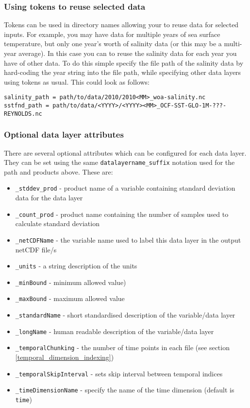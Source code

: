 \documentclass[]{scrartcl}
\begin{document}
{\subsubsection{Using tokens to reuse selected data}
Tokens can be used in directory names allowing your to reuse data for selected inputs. For example, you may have data for multiple years of sea surface temperature, but only one year's worth of salinity data (or this may be a multi-year average). In this case you can to reuse the salinity data for each year you have of other data. To do this simple specify the file path of the salinity data by hard-coding the year string into the file path, while specifying other data layers using tokens as usual. This could look as follows:
\begin{lstlisting}
salinity_path = path/to/data/2010/2010<MM>_woa-salinity.nc
sstfnd_path = path/to/data/<YYYY>/<YYYY><MM>_OCF-SST-GLO-1M-???-REYNOLDS.nc
\end{lstlisting}



\subsubsection{Optional data layer attributes}
There are several optional attributes which can be configured for each data layer. They can be set using the same \texttt{datalayername\_suffix} notation used for the path and products above. These are:
\begin{itemize}
	\item {\texttt{\_stddev\_prod} - product name of a variable containing standard deviation data for the data layer}
	\item {\texttt{\_count\_prod} - product name containing the number of samples used to calculate standard deviation}
	\item {\texttt{\_netCDFName} - the variable name used to label this data layer in the output netCDF file/s}
	\item {\texttt{\_units} - a string description of the units}
	\item {\texttt{\_minBound} - minimum allowed value)}
	\item {\texttt{\_maxBound} - maximum allowed value}
	\item {\texttt{\_standardName} - short standardised description of the variable/data layer}
	\item {\texttt{\_longName} - human readable description of the variable/data layer}
	\item {\texttt{\_temporalChunking} - the number of time points in each file (see section \ref{temporal_dimension_indexing})}
	\item {\texttt{\_temporalSkipInterval} - sets skip interval between temporal indices}
	\item {\texttt{\_timeDimensionName} - specify the name of the time dimension (default is \texttt{time})}
\end{itemize}

}
\end{document}
